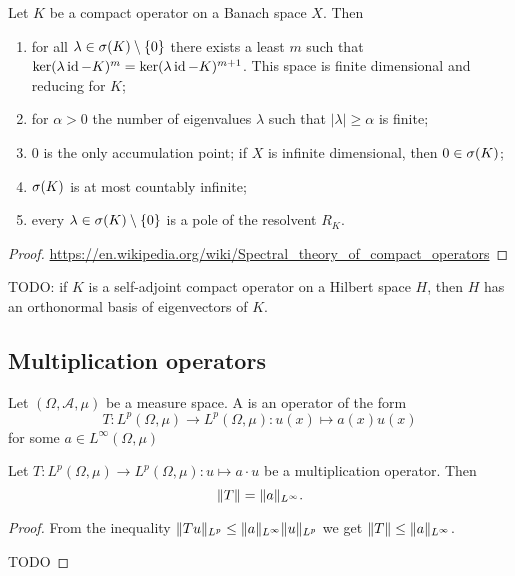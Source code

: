 \begin{proposition} \label{spectrumCompactOperator}
Let $K$ be a compact operator on a Banach space $X$. Then
\begin{enumerate}
\item for all $\lambda\in\sigma(K)\setminus\{0\}$ there exists a least $m$ such that $\ker(\lambda\operatorname{id}- K)^m = \ker(\lambda\operatorname{id}- K)^{m+1}$. This space is finite dimensional and reducing for $K$;
\item for $\alpha > 0$ the number of eigenvalues $\lambda$ such that $|\lambda|\geq \alpha$ is finite;
\item $0$ is the only accumulation point; if $X$ is infinite dimensional, then $0\in\sigma(K)$;
\item $\sigma(K)$ is at most countably infinite;
\item every $\lambda \in \sigma(K)\setminus \{0\}$ is a pole of the resolvent $R_K$.
\end{enumerate}
\end{proposition}
\begin{proof}
\url{https://en.wikipedia.org/wiki/Spectral_theory_of_compact_operators}
\end{proof}
TODO: if $K$ is a self-adjoint compact operator on a Hilbert space $H$, then $H$ has an orthonormal basis of eigenvectors of $K$.


\subsection{Multiplication operators}
\begin{definition}
Let $(\Omega, \mathcal{A}, \mu)$ be a measure space. A  is an operator of the form
\[ T: L^p(\Omega, \mu) \to L^p(\Omega, \mu): u(x) \mapsto a(x)u(x) \]
for some $a\in L^\infty(\Omega,\mu)$
\end{definition}

\begin{proposition}
Let $T: L^p(\Omega, \mu) \to L^p(\Omega, \mu): u \mapsto a\cdot u$ be a multiplication operator. Then
\[ \lVert T\rVert = \lVert a\rVert_{L^\infty}. \]
\end{proposition}
\begin{proof}
From the inequality $\lVert Tu\rVert_{L^p}\leq \lVert a\rVert_{L^\infty}\lVert u\rVert_{L^p}$ we get $\lVert T\rVert \leq \lVert a\rVert_{L^\infty}$.

TODO
\end{proof}

